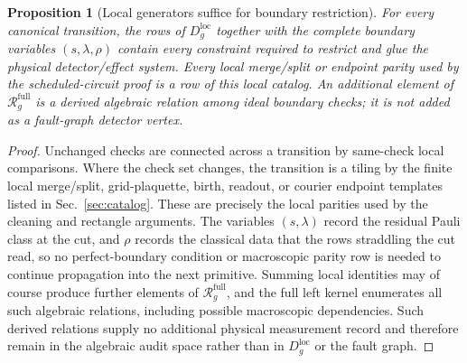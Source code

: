 \documentclass[aps,prx,reprint,superscriptaddress,nofootinbib,floatfix,longbibliography]{revtex4-2}
\newtheorem{proposition}[theorem]{Proposition}
\theoremstyle{definition}
\begin{document}
\begin{proposition}[Local generators suffice for boundary restriction]
\label{prop:local-suffices}
For every canonical transition, the rows of $D_g^{\mathrm{loc}}$ together with the
complete boundary variables $(s,\lambda,\rho)$ contain every constraint required
to restrict and glue the physical detector/effect system.  Every local
merge/split or endpoint parity used by the scheduled-circuit proof is a row of
this local catalog.  An additional element of
$\mathcal R_g^{\mathrm{full}}$ is a derived algebraic relation among ideal boundary
checks; it is not added as a fault-graph detector vertex.
\end{proposition}
\begin{proof}
Unchanged checks are connected across a transition by same-check local
comparisons.  Where the check set changes, the transition is a tiling by the
finite local merge/split, grid-plaquette, birth, readout, or courier endpoint
templates listed in Sec.~\ref{sec:catalog}.  These are precisely the local
parities used by the cleaning and rectangle arguments.  The variables
$(s,\lambda)$ record the residual Pauli class at the cut, and $\rho$ records
the classical data that the rows straddling the cut read, so no
perfect-boundary condition or macroscopic parity row is needed to continue
propagation into the next primitive.  Summing local identities may of course
produce further elements of $\mathcal R_g^{\mathrm{full}}$, and the full left
kernel enumerates all such algebraic relations, including possible
macroscopic dependencies.  Such derived relations supply no additional
physical measurement record and therefore remain in the algebraic audit space
rather than in $D_g^{\mathrm{loc}}$ or the fault graph.
\end{proof}
\end{document}
